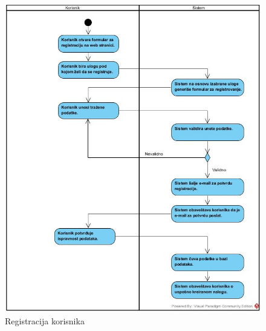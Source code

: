\documentclass{article}
\begin{document}
\newpage

\begin{figure}[htbp!]
\centering
\includegraphics[scale=0.6]{Registracija_korisnika.jpg}
\caption{Registracija korisnika}
\label{slk:dtp}
\end{figure}

\newpage
\end{document}
